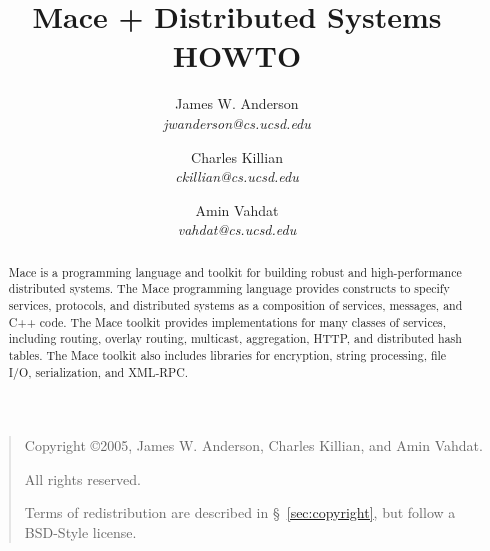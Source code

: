 \documentclass[10pt]{article}
\title{Mace + Distributed Systems HOWTO}
\author{James W. Anderson\\\emph{jwanderson@cs.ucsd.edu} \and
  Charles Killian\\\emph{ckillian@cs.ucsd.edu} \and
  Amin Vahdat\\\emph{vahdat@cs.ucsd.edu}}
\newcommand{\authorlist}{James W. Anderson, Charles Killian, and Amin Vahdat}
\begin{document}
\maketitle

\bigskip
\begin{quote}
Copyright \copyright 2005, \authorlist.

All rights reserved.

Terms of redistribution are described in \S~\ref{sec:copyright}, but 
follow a BSD-Style license.
\end{quote}
\bigskip

\begin{abstract}
\noindent
Mace is a programming language and toolkit for building robust and
high-performance distributed systems.  The Mace programming language
provides constructs to specify services, protocols, and distributed
systems as a composition of services, messages, and C++ code.  The
Mace toolkit provides implementations for many classes of services,
including routing, overlay routing, multicast, aggregation, HTTP, and
distributed hash tables.  The Mace toolkit also includes libraries for
encryption, string processing, file I/O, serialization, and XML-RPC.
\end{abstract}

\tableofcontents












\end{document}
